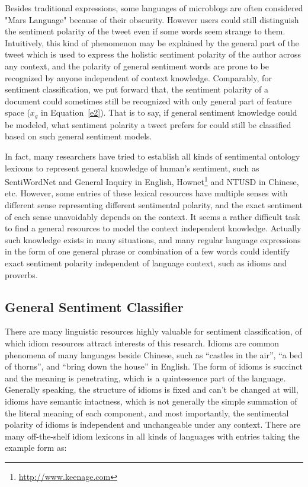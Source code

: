 \documentclass{llncs}
\begin{document}
Besides traditional expressions, some languages of microblogs are often considered "Mars Language" because of their obscurity.  
However users could still distinguish the sentiment polarity of the tweet even if some words seem strange to them.
Intuitively, this kind of phenomenon may be explained by the general part of the tweet which is used to express the holistic sentiment polarity of the author across any context, and the polarity of general sentiment words are prone to be recognized by anyone independent of context knowledge. 
Comparably, for sentiment classification, we put forward that, the sentiment polarity of a document could sometimes still be recognized with only general part of feature space ($ x_{g} $ in Equation~\ref{e2}). 
That is to say, if general sentiment knowledge could be modeled, what sentiment polarity a tweet prefers for could still be classified based on such general sentiment models. 

In fact, many researchers have tried to establish all kinds of sentimental ontology lexicons to represent general knowledge of human’s sentiment, such as SentiWordNet \cite{xsongx:b17} and General Inquiry \cite{xsongx:b18} in English, Hownet\footnote{\url{http://www.keenage.com}} \cite{xsongx:b19} and NTUSD \cite{xsongx:b20} in Chinese, etc. 
However, some entries of these lexical resources have multiple senses with different sense representing different sentimental polarity, and the exact sentiment of each sense unavoidably depends on the context.
It seems a rather difficult task to find a general resources to model the context independent knowledge.
Actually such knowledge exists in many situations, and many regular language expressions in the form of one general phrase or combination of a few words could identify exact sentiment polarity independent of language context, such as idioms and proverbs. 

\subsection{General Sentiment Classifier}
\label{general}

There are many linguistic resources highly valuable for sentiment classification, of which idiom resources attract interests of this research. 
Idioms are common phenomena of many languages beside Chinese, such as ``castles in the air'', ``a bed of thorns'', and ``bring down the house'' in English.
The form of idioms is succinct and the meaning is penetrating, which is a quintessence part of the language. 
Generally speaking, the structure of idioms is fixed and can’t be changed at will, idioms have semantic intactness, which is not generally the simple summation of the literal meaning of each component, and most importantly, the sentimental polarity of idioms is independent and unchangeable under any context. 
There are many off-the-shelf idiom lexicons in all kinds of languages with entries taking the example form as:
\end{document}
